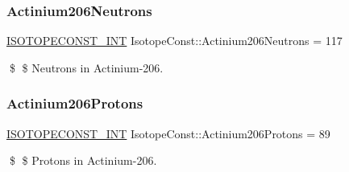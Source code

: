 \subsubsection{\texorpdfstring{Actinium206\+Neutrons}{Actinium206Neutrons}}
{\footnotesize\ttfamily \mbox{\hyperlink{group___isotope_const-_macros_ga5f18360b3e99483a35c32d789e62621c}{I\+S\+O\+T\+O\+P\+E\+C\+O\+N\+S\+T\+\_\+\+I\+NT}} Isotope\+Const\+::\+Actinium206\+Neutrons = 117}

\$ \$ Neutrons in Actinium-\/206. \mbox{\label{group___isotope_const-_actinium-_ac206_ga870afa82e5b00645b1452feef7a68166}} 
\subsubsection{\texorpdfstring{Actinium206\+Protons}{Actinium206Protons}}
{\footnotesize\ttfamily \mbox{\hyperlink{group___isotope_const-_macros_ga5f18360b3e99483a35c32d789e62621c}{I\+S\+O\+T\+O\+P\+E\+C\+O\+N\+S\+T\+\_\+\+I\+NT}} Isotope\+Const\+::\+Actinium206\+Protons = 89}

\$ \$ Protons in Actinium-\/206. 